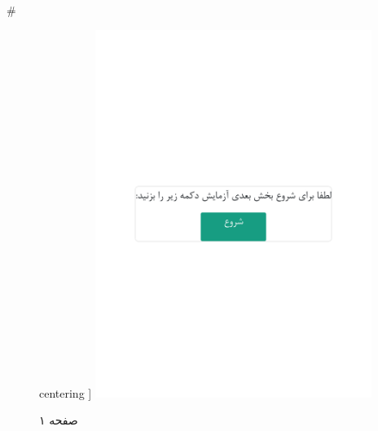 { 
 # 
\begin{figure}[htpb]
centering ]
\includegraphics[width=0.8\textwidth]{./img/Task36.png/}
\caption{صفحه ۱}
\label{fig:Task1}
\end{figure}
 
}
